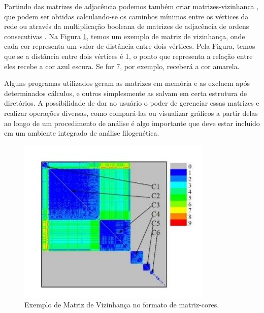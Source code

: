 
Partindo das matrizes de adjacência podemos também criar \gls{matrizes-vizinhanca} \cite{andrade2009}, que podem ser obtidas calculando-se os caminhos mínimos
\cite{bessa2008} entre os vértices da rede ou através da multiplicação booleana de matrizes de adjacência de ordens consecutivas \cite{andrade2006}. Na Figura 
\ref{fig:matriz-vizinhanca}, temos um exemplo de matriz de vizinhança, onde cada cor representa um valor de distância entre dois vértices. Pela Figura, temos
que se a distância entre dois vértices é 1, o ponto que representa a relação entre eles recebe a cor azul escura. Se for 7, por exemplo, receberá a cor
amarela.

Alguns programas utilizados geram as matrizes em memória e as excluem após determinados cálculos, e outros simplesmente as salvam em certa estrutura
de diretórios. A possibilidade de dar ao usuário o poder de gerenciar essas matrizes e realizar operações diversas, como compará-las ou visualizar gráficos
a partir delas ao longo de um procedimento de análise é algo importante que deve estar incluído em um ambiente integrado de análise filogenética.


\begin{figure}
\centering
\includegraphics[scale=0.53]{matriz-vizinhanca}
\caption{Exemplo de Matriz de Vizinhança no formato de \gls{matriz-cores}.}
\label{fig:matriz-vizinhanca}
\end{figure}

